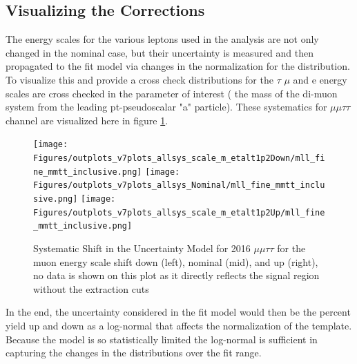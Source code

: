 \subsection{Visualizing the Corrections}
The energy scales for the various leptons used in the analysis are not only changed in the nominal case, but their uncertainty is measured and then propagated to the fit model via changes in the normalization for the distribution. To visualize this and provide a cross check distributions for the $\tau$ $\mu$ and e energy scales are cross checked in the parameter of interest ( the mass of the di-muon system from the leading pt-pseudoscalar "a" particle). 
These systematics for $\mu\mu\tau\tau$ channel are visualized here in figure \ref{fig:sys_shift_mmtt2016}.
\begin{figure}[ht!b]
  \centering
\texttt{[image: Figures/outplots\_v7plots\_allsys\_scale\_m\_etalt1p2Down/mll\_fine\_mmtt\_inclusive.png]} 
\texttt{[image: Figures/outplots\_v7plots\_allsys\_Nominal/mll\_fine\_mmtt\_inclusive.png]}
\texttt{[image: Figures/outplots\_v7plots\_allsys\_scale\_m\_etalt1p2Up/mll\_fine\_mmtt\_inclusive.png]} \\

    \caption{\label{fig:sys_shift_mmtt2016} Systematic Shift in the Uncertainty Model for 2016 $\mu\mu\tau\tau$ for the muon energy scale shift down (left), nominal (mid), and up (right), no data is shown on this plot as it directly reflects the signal region without the extraction cuts }
\end{figure}

In the end, the uncertainty considered in the fit model would then be the percent yield up and down as a log-normal that affects the normalization of the template. Because the model is so statistically limited the log-normal is sufficient in capturing the changes in the distributions over the fit range.  
